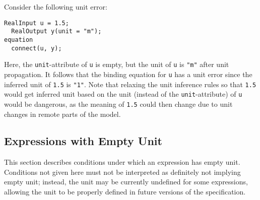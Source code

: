 \begin{example}
Consider the following unit error:
\begin{lstlisting}[language=modelica]
  RealInput u = 1.5;
  RealOutput y(unit = "m");
equation
  connect(u, y);
\end{lstlisting}
Here, the \lstinline!unit!-attribute of \lstinline!u! is empty, but the unit of \lstinline!u! is \lstinline!"m"! after unit propagation.
It follows that the binding equation for \lstinline!u! has a unit error since the inferred unit of \lstinline!1.5! is \lstinline!"1"!.
Note that relaxing the unit inference rules so that \lstinline!1.5! would get inferred unit based on the unit (instead of the \lstinline!unit!-attribute) of \lstinline!u! would be dangerous, as the meaning of \lstinline!1.5! could then change due to unit changes in remote parts of the model.
\end{example}


\subsection{Expressions with Empty Unit}\label{expressions-with-empty-unit}

This section describes conditions under which an expression has empty unit.
Conditions not given here must not be interpreted as definitely not implying empty unit; instead, the unit may be currently undefined for some expressions, allowing the unit to be properly defined in future versions of the specification.

